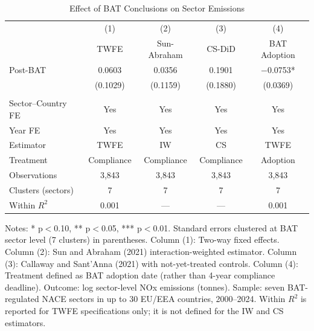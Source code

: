 \begin{table}[H]
\centering
\caption{Effect of BAT Conclusions on Sector Emissions}
\begin{threeparttable}
\begin{tabular}{lcccc}
\toprule
 & (1) & (2) & (3) & (4) \\
 & TWFE & Sun-Abraham & CS-DiD & BAT Adoption \\
\midrule
Post-BAT & 0.0603 & 0.0356 & 0.1901 & $-$0.0753* \\
 & (0.1029) & (0.1159) & (0.1880) & (0.0369) \\
\\
Sector--Country FE & Yes & Yes & Yes & Yes \\
Year FE & Yes & Yes & Yes & Yes \\
Estimator & TWFE & IW & CS & TWFE \\
Treatment & Compliance & Compliance & Compliance & Adoption \\
Observations & 3,843 & 3,843 & 3,843 & 3,843 \\
Clusters (sectors) & 7 & 7 & 7 & 7 \\
Within $R^2$ & 0.001 & --- & --- & 0.001 \\
\bottomrule
\end{tabular}
\begin{tablenotes}[flushleft]
\small
\item Notes: * p$<$0.10, ** p$<$0.05, *** p$<$0.01. Standard errors clustered at BAT sector level (7 clusters) in parentheses. Column (1): Two-way fixed effects. Column (2): Sun and Abraham (2021) interaction-weighted estimator. Column (3): Callaway and Sant'Anna (2021) with not-yet-treated controls. Column (4): Treatment defined as BAT adoption date (rather than 4-year compliance deadline). Outcome: log sector-level NOx emissions (tonnes). Sample: seven BAT-regulated NACE sectors in up to 30 EU/EEA countries, 2000--2024. Within $R^2$ is reported for TWFE specifications only; it is not defined for the IW and CS estimators.
\end{tablenotes}
\end{threeparttable}
\label{tab:main}
\end{table}
